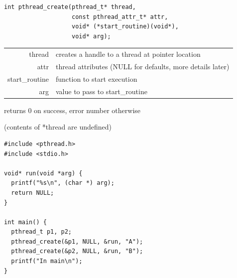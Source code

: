   \begin{slide}


    \begin{verbatim}
int pthread_create(pthread_t* thread, 
                   const pthread_attr_t* attr,
                   void* (*start_routine)(void*),
                   void* arg);
    \end{verbatim}
    \medskip

    \begin{tabular}{rl}
      thread & creates a handle to a thread at pointer location \\

      attr & thread attributes (NULL for defaults, more details later) \\

      start\_routine & function to start execution \\

      arg & value to pass to start\_routine \\
    \end{tabular}

    returns 0 on success, error number otherwise
    
    \leftspace{}(contents of *thread are undefined)

  \end{slide}

  \begin{slide}


	\vspace{-5mm}
	
    \begin{verbatim}
#include <pthread.h>
#include <stdio.h>

void* run(void *arg) {
  printf("%s\n", (char *) arg);
  return NULL;
}

int main() {
  pthread_t p1, p2;
  pthread_create(&p1, NULL, &run, "A");
  pthread_create(&p2, NULL, &run, "B");
  printf("In main\n");
}
    \end{verbatim}

  \end{slide}

